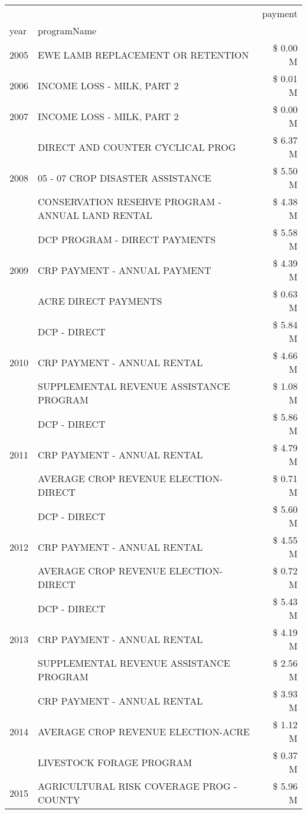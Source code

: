 \begin{tabular}{llr}
\toprule
 &  & payment \\
year & programName &  \\
\midrule
2005 & EWE LAMB REPLACEMENT OR RETENTION & \$ 0.00 M \\
\cline{1-3}
2006 & INCOME LOSS - MILK, PART 2 & \$ 0.01 M \\
\cline{1-3}
2007 & INCOME LOSS - MILK, PART 2 & \$ 0.00 M \\
\cline{1-3}
\multirow[t]{3}{*}{2008} & DIRECT AND COUNTER CYCLICAL PROG & \$ 6.37 M \\
 & 05 - 07 CROP DISASTER ASSISTANCE & \$ 5.50 M \\
 & CONSERVATION RESERVE PROGRAM - ANNUAL LAND RENTAL & \$ 4.38 M \\
\cline{1-3}
\multirow[t]{3}{*}{2009} & DCP PROGRAM - DIRECT PAYMENTS & \$ 5.58 M \\
 & CRP PAYMENT - ANNUAL PAYMENT & \$ 4.39 M \\
 & ACRE DIRECT PAYMENTS & \$ 0.63 M \\
\cline{1-3}
\multirow[t]{3}{*}{2010} & DCP - DIRECT & \$ 5.84 M \\
 & CRP PAYMENT - ANNUAL RENTAL & \$ 4.66 M \\
 & SUPPLEMENTAL REVENUE ASSISTANCE PROGRAM & \$ 1.08 M \\
\cline{1-3}
\multirow[t]{3}{*}{2011} & DCP - DIRECT & \$ 5.86 M \\
 & CRP PAYMENT - ANNUAL RENTAL & \$ 4.79 M \\
 & AVERAGE CROP REVENUE ELECTION-DIRECT & \$ 0.71 M \\
\cline{1-3}
\multirow[t]{3}{*}{2012} & DCP - DIRECT & \$ 5.60 M \\
 & CRP PAYMENT - ANNUAL RENTAL & \$ 4.55 M \\
 & AVERAGE CROP REVENUE ELECTION-DIRECT & \$ 0.72 M \\
\cline{1-3}
\multirow[t]{3}{*}{2013} & DCP - DIRECT & \$ 5.43 M \\
 & CRP PAYMENT - ANNUAL RENTAL & \$ 4.19 M \\
 & SUPPLEMENTAL REVENUE ASSISTANCE PROGRAM & \$ 2.56 M \\
\cline{1-3}
\multirow[t]{3}{*}{2014} & CRP PAYMENT - ANNUAL RENTAL & \$ 3.93 M \\
 & AVERAGE CROP REVENUE ELECTION-ACRE & \$ 1.12 M \\
 & LIVESTOCK FORAGE PROGRAM & \$ 0.37 M \\
\cline{1-3}
\multirow[t]{3}{*}{2015} & AGRICULTURAL RISK COVERAGE PROG - COUNTY & \$ 5.96 M \\

\end{tabular}
